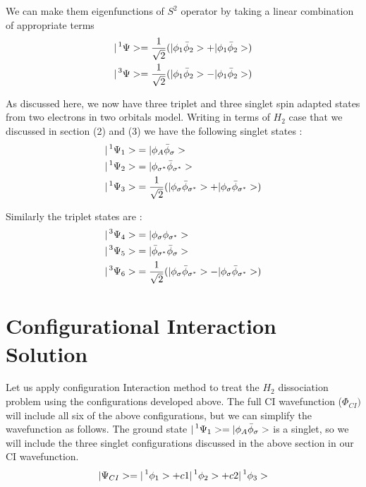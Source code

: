\documentclass[11pt]{article}   	%
\begin{document}
	We can make them eigenfunctions of $S^2$ operator by taking a linear combination of appropriate terms
	\\
	\begin{equation}
	\begin{split}
		|\prescript{1}{}{\Psi}>=\frac{1}{\sqrt{2}}(|\phi_1\bar{\phi}_2>+|\phi_1\bar{\phi}_2>)\\	
		|\prescript{3}{}{\Psi}>=\frac{1}{\sqrt{2}}(|\phi_1\bar{\phi}_2>-|\phi_1\bar{\phi}_2>)\\
	\end{split}
	\end{equation}
	
	As discussed here, we now have three triplet and three singlet spin adapted states 
	from two electrons in two orbitals model. Writing in terms of $H_2$ case that we discussed in 
	section (2) and (3) we have the following singlet states :\\
	\begin{equation}
	\begin{split}
		|\prescript{1}{}{\Psi_1}>&=|\phi_A\bar{\phi}_{\sigma}>\\
		|\prescript{1}{}{\Psi_2}>&=|\phi_{\sigma^*}\bar{\phi}_{\sigma^*}>\\
		|\prescript{1}{}{\Psi_3}>&=\frac{1}{\sqrt{2}}(|\phi_{\sigma}\bar{\phi}_{\sigma^*}>+
		|\phi_{\sigma}\bar{\phi}_{\sigma^*}>)\\	
	\end{split}
	\end{equation}
	
	Similarly the triplet states are :\\
	\begin{equation}
	\begin{split}
		|\prescript{3}{}{\Psi_4}>&=|\phi_{\sigma}\phi_{\sigma^*}>\\
		|\prescript{3}{}{\Psi_5}>&=|\bar{\phi}_{\sigma^*}\bar{\phi}_{\sigma}>\\
		|\prescript{3}{}{\Psi_6}>&=\frac{1}{\sqrt{2}}(|\phi_{\sigma}\bar{\phi}_{\sigma^*}>-
		|\phi_{\sigma}\bar{\phi}_{\sigma^*}>)\\
	\end{split}
	\end{equation}
\section{Configurational Interaction Solution}
	Let us apply configuration Interaction method to treat the $H_2$ dissociation problem using the configurations developed above. 
	The full CI wavefunction ($\Phi_{CI})$ will include all six of the above configurations, but we can simplify the wavefunction as follows. 
	The ground state $|\prescript{1}{}{\Psi_1}>=|\phi_A\bar{\phi}_{\sigma}>$ is a singlet, so we will include the three singlet configurations 
	discussed in the above section in our CI wavefunction.\\
	\begin{equation}
	\begin{split}
		|\Psi_{CI}>=|\prescript{1}{}{\phi_1}>+c1|\prescript{1}{}{\phi_2}>+c2|\prescript{1}{}{\phi_3}>
	\end{split}
	\end{equation}
	
\end{document}
